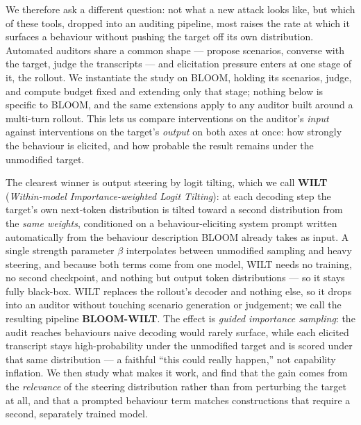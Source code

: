 \documentclass{article}
\theoremstyle{plain}
\theoremstyle{definition}
\theoremstyle{remark}
\begin{document}
We therefore ask a different question: not what a new attack looks like, but which of these tools, dropped into an auditing pipeline, most raises the rate at which it surfaces a behaviour without pushing the target off its own distribution.
Automated auditors share a common shape --- propose scenarios, converse with the target, judge the transcripts --- and elicitation pressure enters at one stage of it, the rollout. We instantiate the study on BLOOM, holding its scenarios, judge, and compute budget fixed and extending only that stage; nothing below is specific to BLOOM, and the same extensions apply to any auditor built around a multi-turn rollout. This lets us compare interventions on the auditor's \emph{input} against interventions on the target's \emph{output} on both axes at once: how strongly the behaviour is elicited, and how probable the result remains under the unmodified target.

The clearest winner is output steering by logit tilting, which we call \textbf{WILT} (\emph{Within-model Importance-weighted Logit Tilting}): at each decoding step the target's own next-token distribution is tilted toward a second distribution from the \emph{same weights}, conditioned on a behaviour-eliciting system prompt written automatically from the behaviour description BLOOM already takes as input.
A single strength parameter $\beta$ interpolates between unmodified sampling and heavy steering, and because both terms come from one model, WILT needs no training, no second checkpoint, and nothing but output token distributions --- so it stays fully black-box. WILT replaces the rollout's decoder and nothing else, so it drops into an auditor without touching scenario generation or judgement; we call the resulting pipeline \textbf{BLOOM-WILT}.
The effect is \emph{guided importance sampling}: the audit reaches behaviours naive decoding would rarely surface, while each elicited transcript stays high-probability under the unmodified target and is scored under that same distribution --- a faithful ``this could really happen,'' not capability inflation.
We then study what makes it work, and find that the gain comes from the \emph{relevance} of the steering distribution rather than from perturbing the target at all, and that a prompted behaviour term matches constructions that require a second, separately trained model.
\end{document}
